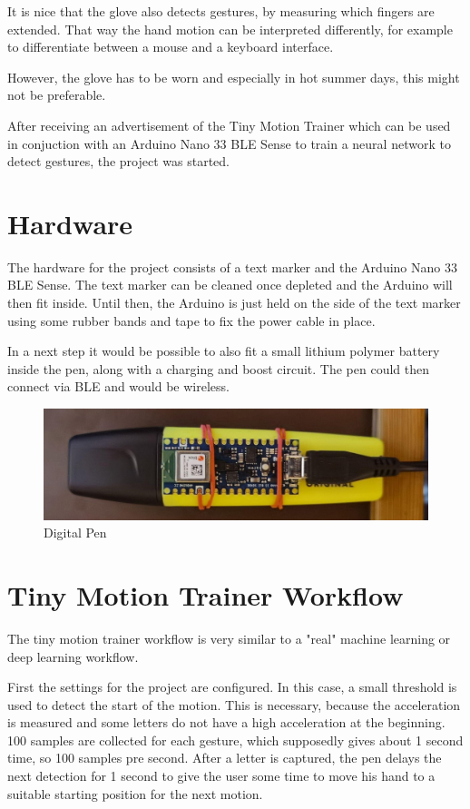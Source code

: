 \documentclass[a4paper,titlepage]{article}
\begin{document}
It is nice that the glove also detects gestures, by measuring which fingers are extended.
That way the hand motion can be interpreted differently, for example to differentiate between a mouse and a keyboard interface.

However, the glove has to be worn and especially in hot summer days, this might not be preferable.

After receiving an advertisement of the Tiny Motion Trainer which can be used in conjuction with an Arduino Nano 33 BLE Sense to train a neural network to detect gestures, the project was started.

\section{Hardware}

The hardware for the project consists of a text marker and the Arduino Nano 33 BLE Sense.
The text marker can be cleaned once depleted and the Arduino will then fit inside.
Until then, the Arduino is just held on the side of the text marker using some rubber bands and tape to fix the power cable in place.

In a next step it would be possible to also fit a small lithium polymer battery inside the pen, along with a charging and boost circuit.
The pen could then connect via BLE and would be wireless.

\begin{figure}[H]
    \includegraphics[width=\textwidth]{pen.jpg}
    \caption{Digital Pen}
\end{figure}

\newpage
\section{Tiny Motion Trainer Workflow}

The tiny motion trainer workflow is very similar to a "real" machine learning or deep learning workflow.

First the settings for the project are configured.
In this case, a small threshold is used to detect the start of the motion.
This is necessary, because the acceleration is measured and some letters do not have a high acceleration at the beginning.
100 samples are collected for each gesture, which supposedly gives about 1 second time, so 100 samples pre second.
After a letter is captured, the pen delays the next detection for 1 second to give the user some time to move his hand to a suitable starting position for the next motion.
\end{document}
